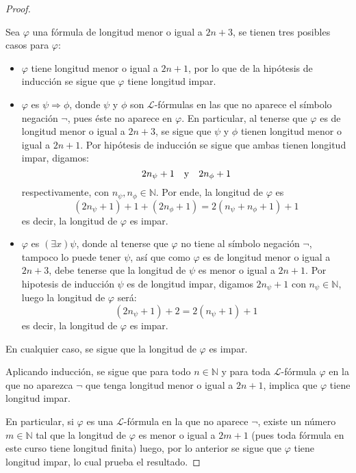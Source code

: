 \documentclass[12pt]{article}
\newcounter{it}
\theoremstyle{largebreak}
\begin{document}
\begin{proof}
\begin{itemize}
            Sea $\varphi$ una fórmula de longitud menor o igual a $2n+3$, se tienen tres posibles casos para $\varphi$:
            \begin{itemize}
                \item $\varphi$ tiene longitud menor o igual a $2n+1$, por lo que de la hipótesis de inducción se sigue que $\varphi$ tiene longitud impar.
                \item $\varphi$ es $\psi\Rightarrow\phi$, donde $\psi$ y $\phi$ son $\mathcal{L}$-fórmulas en las que no aparece el símbolo negación $\neg$, pues éste no aparece en $\varphi$. En particular, al tenerse que $\varphi$ es de longitud menor o igual a $2n+3$, se sigue que $\psi$ y $\phi$ tienen longitud menor o igual a $2n+1$. Por hipótesis de inducción se sigue que ambas tienen longitud impar, digamos:
                \begin{equation*}
                    2n_\psi+1\quad\textup{y}\quad 2n_\phi+1
                \end{equation*}
                respectivamente, con $n_\psi,n_\phi\in\mathbb{N}$. Por ende, la longitud de $\varphi$ es
                \begin{equation*}
                    (2n_\psi+1)+1+(2n_\phi+1)=2(n_\psi+n_\phi+1)+1
                \end{equation*}
                es decir, la longitud de $\varphi$ es impar.
                \item $\varphi$ es $(\exists x)\psi$, donde al tenerse que $\varphi$ no tiene al símbolo negación $\neg$, tampoco lo puede tener $\psi$, así que como $\varphi$ es de longitud menor o igual a $2n+3$, debe tenerse que la longitud de $\psi$ es menor o igual a $2n+1$. Por hipotesis de inducción $\psi$ es de longitud impar, digamos $2n_\psi+1$ con $n_\psi\in\mathbb{N}$, luego la longitud de $\varphi$ será:
                \begin{equation*}
                    (2n_\psi+1)+2=2(n_\psi+1)+1
                \end{equation*}
                es decir, la longitud de $\varphi$ es impar.
            \end{itemize}
            En cualquier caso, se sigue que la longitud de $\varphi$ es impar.
        \end{itemize}
        Aplicando inducción, se sigue que para todo $n\in\mathbb{N}$ y para toda $\mathcal{L}$-fórmula $\varphi$ en la que no aparezca $\neg$ que tenga longitud menor o igual a $2n+1$, implica que $\varphi$ tiene longitud impar.
        
        En particular, si $\varphi$ es una $\mathcal{L}$-fórmula en la que no aparece $\neg$, existe un número $m\in\mathbb{N}$ tal que la longitud de $\varphi$ es menor o igual a $2m+1$ (pues toda fórmula en este curso tiene longitud finita) luego, por lo anterior se sigue que $\varphi$ tiene longitud impar, lo cual prueba el resultado.
    \end{proof}
    
\end{document}
